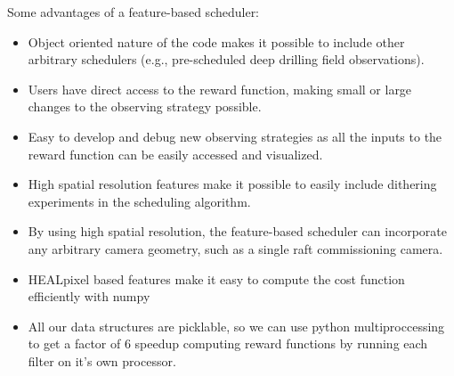 \documentclass[12pt,preprint]{aastex}
\begin{document}
Some advantages of a feature-based scheduler:
\begin{itemize}
    \item{Object oriented nature of the code makes it possible to include other arbitrary schedulers (e.g., pre-scheduled deep drilling field observations).}
    \item{Users have direct access to the reward function, making small or large changes to the observing strategy possible.}
    \item{Easy to develop and debug new observing strategies as all the inputs to the reward function can be easily accessed and visualized.}
    \item{High spatial resolution features make it possible to easily include dithering experiments in the scheduling algorithm.}
    \item{By using high spatial resolution, the feature-based scheduler can incorporate any arbitrary camera geometry, such as a single raft commissioning camera.}
    \item{HEALpixel based features make it easy to compute the cost function efficiently with numpy}
    \item{All our data structures are picklable, so we can use python multiproccessing to get a factor of 6 speedup computing reward functions by running each filter on it's own processor.}
\end{itemize}




\end{document}
